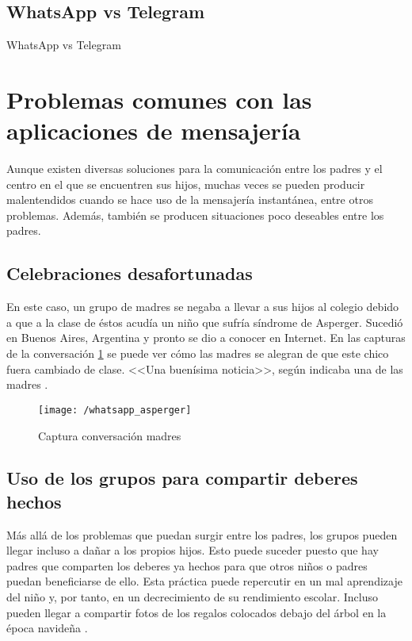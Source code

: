 \subsection{WhatsApp vs Telegram}

\begin{table}[hp]
	\centering
	{\small
		
	}
	\caption[WhatsApp vs Telegram]
	{WhatsApp vs Telegram}
	\label{tab:whatsappvstelegram}
\end{table}

\newpage

\section{Problemas comunes con las aplicaciones de mensajería}
Aunque existen diversas soluciones para la comunicación entre los padres y el centro en el que se encuentren sus hijos, muchas veces se pueden producir malentendidos cuando se hace uso de la mensajería instantánea, entre otros problemas. Además, también se producen situaciones poco deseables entre los padres.

\subsection{Celebraciones desafortunadas}
En este caso, un grupo de madres se negaba a llevar a sus hijos al colegio debido a que a la clase de éstos acudía un niño que sufría síndrome de Asperger. Sucedió en Buenos Aires, Argentina y pronto se dio a conocer en Internet.
En las capturas de la conversación \ref{fig:whatasper} se puede ver cómo las madres se alegran de que este chico fuera cambiado de clase. <<Una buenísima noticia>>, según indicaba una de las madres \cite{Vanguardia2017}.

\begin{figure}[!h]
	\begin{center}
		\texttt{[image: /whatsapp\_asperger]}
		\caption{Captura conversación madres}
		\label{fig:whatasper}
	\end{center}
\end{figure}

\subsection{Uso de los grupos para compartir deberes hechos}
Más allá de los problemas que puedan surgir entre los padres, los grupos pueden llegar incluso a dañar a los propios hijos. Esto puede suceder puesto que hay padres que comparten los deberes ya hechos para que otros niños o padres puedan beneficiarse de ello. Esta práctica puede repercutir en un mal aprendizaje del niño y, por tanto, en un decrecimiento de su rendimiento escolar. Incluso pueden llegar a compartir fotos de los regalos colocados debajo del árbol en la época navideña \cite{Alias2017}.

